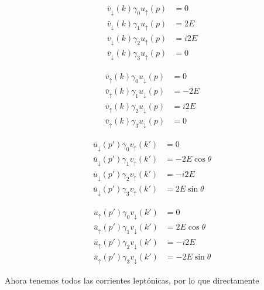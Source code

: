 \begin{minipage}{0.48\linewidth}
\begin{align*}
    \bar{v}_\downarrow (k) \gamma_0 {u}_\uparrow (p) & = 0 \\
    \bar{v}_\downarrow (k) \gamma_1 {u}_\uparrow (p) & = 2E \\
    \bar{v}_\downarrow (k) \gamma_2 {u}_\uparrow (p) & = i2E \\
    \bar{v}_\downarrow (k) \gamma_3 {u}_\uparrow (p) & = 0
\end{align*}
\end{minipage} \hfill
\begin{minipage}{0.48\linewidth}
\begin{align*}
    \bar{v}_\uparrow (k) \gamma_0 {u}_\downarrow (p) & = 0 \\
    \bar{v}_\uparrow (k) \gamma_1 {u}_\downarrow (p) & = -2E \\
    \bar{v}_\uparrow (k) \gamma_2 {u}_\downarrow (p) & = i2E \\
    \bar{v}_\uparrow (k) \gamma_3 {u}_\downarrow (p) & = 0
\end{align*}
\end{minipage}
\vspace*{1em}
\begin{minipage}{0.48\linewidth}
\begin{align*}
    \bar{u}_\downarrow (p') \gamma_0 {v}_\uparrow (k') & = 0 \\
    \bar{u}_\downarrow (p') \gamma_1 {v}_\uparrow (k') & = -2E\cos \theta \\
    \bar{u}_\downarrow (p') \gamma_2 {v}_\uparrow (k') & = -i2E \\
    \bar{u}_\downarrow (p') \gamma_3 {v}_\uparrow (k') & = 2E\sin \theta
\end{align*}	
\end{minipage} \hfill
\begin{minipage}{0.48\linewidth}
\begin{align*}
    \bar{u}_\uparrow (p') \gamma_0 {v}_\downarrow (k') & = 0 \\
    \bar{u}_\uparrow (p') \gamma_1 {v}_\downarrow (k') & = 2E\cos \theta  \\
    \bar{u}_\uparrow (p') \gamma_2 {v}_\downarrow (k') & = -i2E  \\
    \bar{u}_\uparrow (p') \gamma_3 {v}_\downarrow (k') & = -2E\sin \theta
\end{align*}
\end{minipage}
Ahora tenemos todos las corrientes leptónicas, por lo que directamente 

